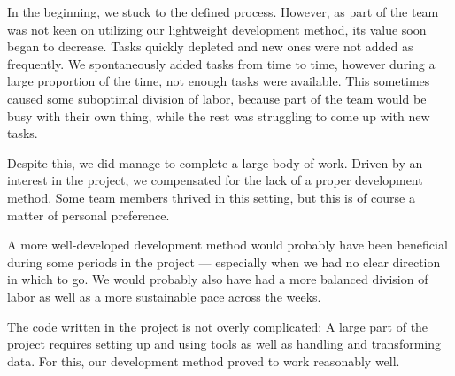 In the beginning, we stuck to the defined process. However, as part of the team was not keen on utilizing our lightweight development method, its value soon began to decrease. Tasks quickly depleted and new ones were not added as frequently. We spontaneously added tasks from time to time, however during a large proportion of the time, not enough tasks were available. This sometimes caused some suboptimal division of labor, because part of the team would be busy with their own thing, while the rest was struggling to come up with new tasks.

Despite this, we did manage to complete a large body of work. Driven by an interest in the project, we compensated for the lack of a proper development method. Some team members thrived in this setting, but this is of course a matter of personal preference.

A more well-developed development method would probably have been beneficial during some periods in the project --- especially when we had no clear direction in which to go. We would probably also have had a more balanced division of labor as well as a more sustainable pace across the weeks.

The code written in the project is not overly complicated; A large part of the project requires setting up and using tools as well as handling and transforming data. For this, our development method proved to work reasonably well.



